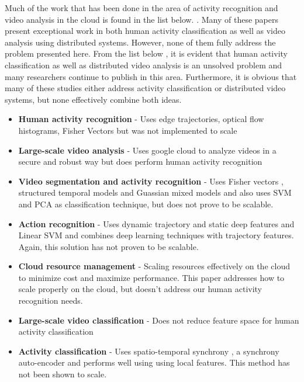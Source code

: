 Much of the work that has been done in the area of activity recognition and
video analysis in the cloud is found in
the list below.
. Many of these papers present exceptional work in both human activity
classification as well as video analysis using distributed systems. However,
none of them fully address the problem presented here. From
the list below
, it is evident that human activity classification as
well as distributed video analysis is an unsolved problem and many researchers
continue to publish in this area. Furthermore, it is obvious that many of these
studies either address activity classification or distributed video systems, but
none effectively combine both ideas.
\begin{itemize}
  \item \textbf{Human activity recognition} \cite{wang2016action} - Uses edge trajectories,
  optical flow histograms, Fisher Vectors but was not implemented to scale
  \item \textbf{Large-scale video analysis} \cite{wang2016cloud}  - Uses  google cloud
  to analyze videos in a secure and robust way but does perform human activity recognition
  \item \textbf{Video segmentation and activity recognition} \cite{kuehne2016end} - Uses Fisher vectors
  , structured temporal models and Guassian  mixed models and also uses SVM and PCA as classification
  technique, but does not prove to be scalable.
  \item \textbf{Action recognition} \cite{cai2016towards} - Uses dynamic trajectory and static deep features
   and Linear SVM and combines deep learning techniques with trajectory features. Again, this solution
   has not proven to be scalable.
   \item \textbf{Cloud resource management} \cite{kaseb2015cloud} - Scaling resources effectively
   on the cloud to minimize cost and maximize performance. This paper addresses how to scale
   properly on the cloud, but doesn't address our human activity recognition needs.
   \item \textbf{Large-scale video classification} \cite{karpathy2014large} - Does not reduce
   feature space for human activity classification
   \item \textbf{Activity classification} \cite{niebles2010modeling}- Uses spatio-temporal synchrony
   , a synchrony auto-encoder and performs well using using local features. This method has
   not been shown to scale.
\end{itemize}


